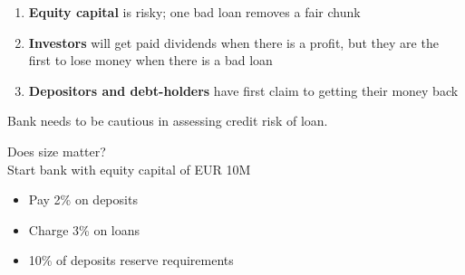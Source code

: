 \documentclass{beamer}
\begin{document}
\begin{frame}
\begin{table}[!h] \centering
\caption{Balance sheet after expanding the business}
\end{table}

\end{frame}

\begin{frame} 
\begin{enumerate}
  \item \textbf{Equity capital} is risky; one bad loan removes a fair chunk
  \item \textbf{Investors} will get paid dividends when there is a profit, but they are the first to lose money when there is a bad loan
  \item \textbf{Depositors and debt-holders} have first claim to getting their money back
\end{enumerate}
 \medskip
  Bank needs to be cautious in assessing credit risk of loan.
\end{frame}

\begin{frame}
 Does size matter?\\
 \medskip
 Start bank with equity capital of EUR 10M 
 \begin{itemize}
  \item Pay 2\% on deposits
  \item Charge 3\% on loans
  \item 10\% of deposits reserve requirements 
\end{itemize}
\end{frame}
\end{document}
